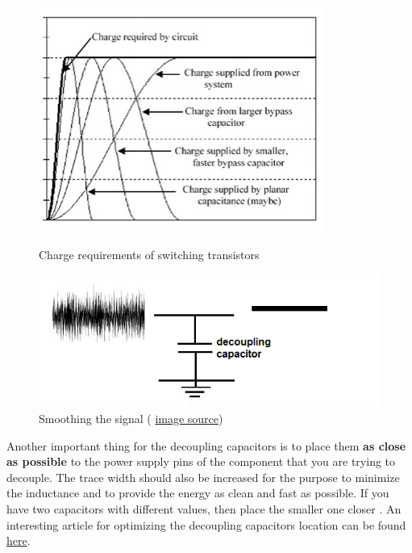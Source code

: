 \documentclass[final]{cubedoc}
\begin{document}
	\begin{figure}[h!]
		\centering
		\begin{minipage}[b]{0.4\textwidth}
			\includegraphics[keepaspectratio, width = \textwidth, height=.3\textheight]{assets/bypass_charge.png}
			\caption{Charge requirements of switching transistors \cite{brooks2003signal}}	
		\end{minipage}
		\hfill
		\begin{minipage}[b]{0.4\textwidth}
			\includegraphics[keepaspectratio, width = \textwidth]{assets/decoupling.png}
			\caption{Smoothing the signal \small{( \href{https://web.archive.org/web/20200814192057/http://www.learningaboutelectronics.com/Articles/Decoupling-capacitor.php}{image source}})}
		\end{minipage}
	\end{figure}
	
	Another important thing for the decoupling capacitors is to place them \textbf{as close as possible} to the power supply pins of the component that you are trying to decouple. The trace width should also be increased for the purpose to minimize the inductance and to provide the energy as clean and fast as possible.
	If you have two capacitors with different values, then place the smaller one closer \cite{brooks2003signal, instruments2006high}. An interesting article for optimizing the decoupling capacitors location can be found \href{https://www.allaboutcircuits.com/technical-articles/pcb-layout-tips-and-tricks-how-to-optimize-your-decoupling-connection/}{here}.
	
\end{document}

